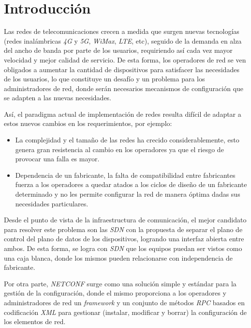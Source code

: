 
\chapter{Introducción} %

\label{Chapter1} %

Las redes de telecomunicaciones crecen a medida que surgen nuevas tecnologías (redes inalámbricas \textit{4G} y \textit{5G}, \textit{WiMax}, \textit{LTE}, etc), seguido de la demanda en alza del ancho de banda por parte de los usuarios, requiriendo así cada vez mayor velocidad y mejor calidad de servicio. De esta forma, los operadores de red se ven obligados a aumentar la cantidad de dispositivos para satisfacer las necesidades de los usuarios, lo que constituye un desafío y un problema para los administradores de red, donde serán necesarios mecanismos de configuración que se adapten a las nuevas necesidades. 

Así, el paradigma actual de implementación de redes resulta difícil de adaptar a estos nuevos cambios en los requerimientos, por ejemplo:

\begin{itemize}     
    \item La complejidad y el tamaño de las redes ha crecido considerablemente, esto genera gran resistencia al cambio en los operadores ya que el riesgo de provocar una falla es mayor.

    \item Dependencia  de  un  fabricante,  la  falta  de  compatibilidad  entre  fabricantes fuerza a los operadores a quedar atados a los ciclos de diseño de un fabricante determinado y no les permite configurar la red de manera óptima dadas sus necesidades particulares. 
\end{itemize}

Desde el punto de vista de la infraestructura de comunicación, el mejor candidato para resolver este problema son las \textit{SDN} con la propuesta de separar el plano de control del plano de datos de los dispositivos, logrando una interfaz abierta entre ambos. De esta forma, se logra con \textit{SDN} que los equipos puedan ser vistos como una caja blanca, donde los mismos pueden relacionarse con independencia de fabricante. 

Por otra parte, \textit{NETCONF} surge como una solución simple y estándar para la gestión de la configuración, donde el mismo proporciona a los operadores y administradores de red un \textit{framework} y un conjunto de métodos \textit{RPC} basados en codificación \textit{XML} para gestionar (instalar, modificar y borrar) la configuración de los elementos de red.

